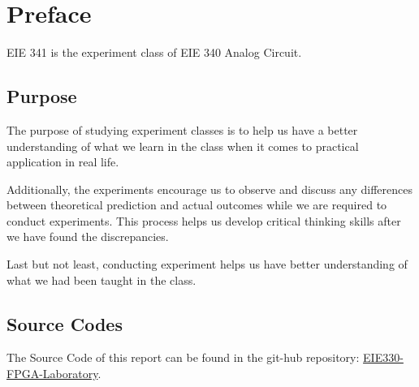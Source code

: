 \setcounter{chapter}{-1}
\chapter{Preface}
\Large EIE 341 is the experiment class of EIE 340 Analog Circuit.\par

\section{Purpose}

The purpose of studying experiment classes is to help us have a
better understanding of what we learn in the class when it comes to practical application in real life.\par

Additionally, the experiments encourage us to observe and discuss any differences between theoretical prediction and actual outcomes while we are required to conduct experiments. This process helps us develop critical thinking skills after we have found the discrepancies.\par

Last but not least, conducting experiment helps us have better understanding of what we had been taught in the class.

\section{Source Codes}
The Source Code of this report can be found in the git-hub repository: 
    \href{https://github.com/ZeppelinSCB/EIE330-FPGA-LAB-Report}
        {EIE330-FPGA-Laboratory}.